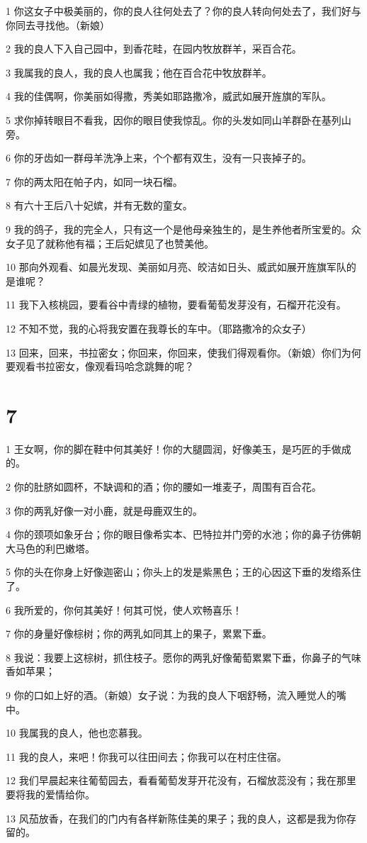 \par 1 你这女子中极美丽的，你的良人往何处去了？你的良人转向何处去了，我们好与你同去寻找他。（新娘）
\par 2 我的良人下入自己园中，到香花畦，在园内牧放群羊，采百合花。
\par 3 我属我的良人，我的良人也属我；他在百合花中牧放群羊。
\par 4 我的佳偶啊，你美丽如得撒，秀美如耶路撒冷，威武如展开旌旗的军队。
\par 5 求你掉转眼目不看我，因你的眼目使我惊乱。你的头发如同山羊群卧在基列山旁。
\par 6 你的牙齿如一群母羊洗净上来，个个都有双生，没有一只丧掉子的。
\par 7 你的两太阳在帕子内，如同一块石榴。
\par 8 有六十王后八十妃嫔，并有无数的童女。
\par 9 我的鸽子，我的完全人，只有这一个是他母亲独生的，是生养他者所宝爱的。众女子见了就称他有福；王后妃嫔见了也赞美他。
\par 10 那向外观看、如晨光发现、美丽如月亮、皎洁如日头、威武如展开旌旗军队的是谁呢？
\par 11 我下入核桃园，要看谷中青绿的植物，要看葡萄发芽没有，石榴开花没有。
\par 12 不知不觉，我的心将我安置在我尊长的车中。（耶路撒冷的众女子）
\par 13 回来，回来，书拉密女；你回来，你回来，使我们得观看你。（新娘）你们为何要观看书拉密女，像观看玛哈念跳舞的呢？

\chapter{7}

\par 1 王女啊，你的脚在鞋中何其美好！你的大腿圆润，好像美玉，是巧匠的手做成的。
\par 2 你的肚脐如圆杯，不缺调和的酒；你的腰如一堆麦子，周围有百合花。
\par 3 你的两乳好像一对小鹿，就是母鹿双生的。
\par 4 你的颈项如象牙台；你的眼目像希实本、巴特拉并门旁的水池；你的鼻子彷佛朝大马色的利巴嫩塔。
\par 5 你的头在你身上好像迦密山；你头上的发是紫黑色；王的心因这下垂的发绺系住了。
\par 6 我所爱的，你何其美好！何其可悦，使人欢畅喜乐！
\par 7 你的身量好像棕树；你的两乳如同其上的果子，累累下垂。
\par 8 我说：我要上这棕树，抓住枝子。愿你的两乳好像葡萄累累下垂，你鼻子的气味香如苹果；
\par 9 你的口如上好的酒。（新娘）女子说：为我的良人下咽舒畅，流入睡觉人的嘴中。
\par 10 我属我的良人，他也恋慕我。
\par 11 我的良人，来吧！你我可以往田间去；你我可以在村庄住宿。
\par 12 我们早晨起来往葡萄园去，看看葡萄发芽开花没有，石榴放蕊没有；我在那里要将我的爱情给你。
\par 13 风茄放香，在我们的门内有各样新陈佳美的果子；我的良人，这都是我为你存留的。


